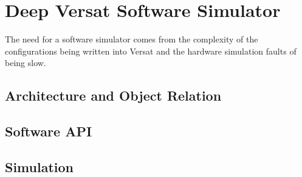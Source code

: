 \chapter{Deep Versat Software Simulator}
\label{chapter:Simulator}

The need for a software simulator comes from the complexity of the configurations being written into Versat and
the hardware simulation faults of being slow.

\section{Architecture and Object Relation}



\section{Software API}


\section{Simulation}


